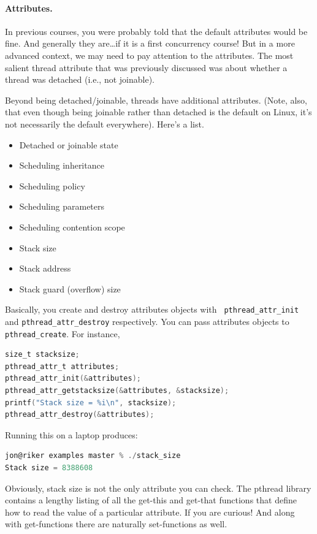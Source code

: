 \documentclass[a4paper]{report}
\begin{document}
\paragraph{Attributes.} In previous courses, you were probably told that the default attributes would be fine. And generally they are\ldots if it is a first concurrency course! But in a more advanced context, we may need to pay attention to the attributes. The most salient thread attribute that was previously discussed was about whether a thread was detached (i.e., not joinable).

Beyond being detached/joinable, threads have additional
attributes. (Note, also, that even though being joinable rather than
detached is the default on Linux, it's not necessarily the default everywhere).
Here's a list.
  \begin{itemize}
    \item Detached or joinable state
    \item Scheduling inheritance
    \item Scheduling policy
    \item Scheduling parameters
    \item Scheduling contention scope
    \item Stack size
    \item Stack address
    \item Stack guard (overflow) size
  \end{itemize}

Basically, you create and destroy attributes objects with {\tt
  pthread\_attr\_init} and {\tt pthread\_attr\_destroy}
respectively. You can pass attributes objects to {\tt
  pthread\_create}. For instance,

  \begin{lstlisting}[language=C]
size_t stacksize;
pthread_attr_t attributes;
pthread_attr_init(&attributes);
pthread_attr_getstacksize(&attributes, &stacksize);
printf("Stack size = %i\n", stacksize);
pthread_attr_destroy(&attributes);
  \end{lstlisting}

Running this on a laptop produces:

  \begin{lstlisting}[language=C]
jon@riker examples master % ./stack_size 
Stack size = 8388608
  \end{lstlisting}
  
Obviously, stack size is not the only attribute you can check. The pthread library contains a lengthy listing of all the get-this and get-that functions that define how to read the value of a particular attribute. If you are curious! And along with get-functions there are naturally set-functions as well.
\end{document}
